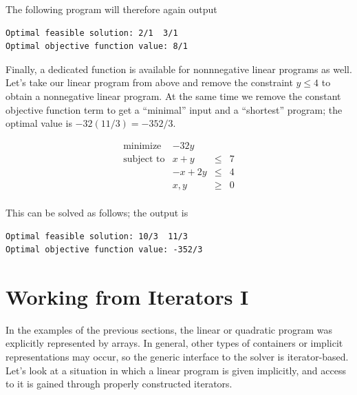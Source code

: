 The following program will therefore again output
\begin{verbatim}
Optimal feasible solution: 2/1  3/1
Optimal objective function value: 8/1
\end{verbatim}


Finally, a dedicated function is available for nonnnegative linear
programs as well. Let's take our linear program from above and remove
the constraint $y\leq 4$ to obtain a nonnegative linear program. At
the same time we remove the constant objective function term to get
a ``minimal'' input and a ``shortest'' program; the optimal value is
$-32(11/3)=-352/3$.

\[
\begin{array}{lrcl}
\mbox{minimize}       & - 32y \\
\mbox{subject to}     & x + y &\leq& 7 \\
                      & -x + 2y &\leq& 4 \\
                      & x,y &\geq& 0 \\
\end{array}
\] 

This can be solved as follows; the output is
\begin{verbatim}
Optimal feasible solution: 10/3  11/3
Optimal objective function value: -352/3
\end{verbatim}


\section{Working from Iterators I}\label{sec:QP-working_from_iterators}
In the examples of the previous sections, the linear or quadratic
program was explicitly represented by arrays. In general, other types
of containers or implicit representations may occur, so the
generic interface to the solver is iterator-based. Let's look at a
situation in which a linear program is given implicitly, and
access to it is gained through properly constructed iterators.

